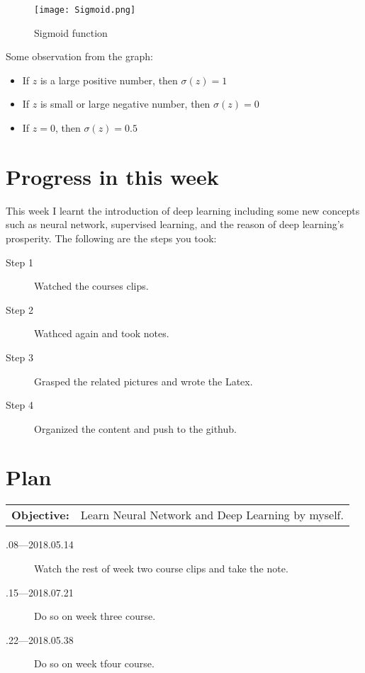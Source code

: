 \documentclass[a4paper]{article}
\begin{document}
\begin{figure}[!htp]
\begin{center}
   \texttt{[image: Sigmoid.png]}
\end{center}
   \caption{Sigmoid function}
   \label{fig:sigmoid}
\end{figure}
Some observation from the graph:
\begin{itemize}
\item If $z$ is a large positive number, then $\sigma(z)=1$
\item If $z$ is small or large negative number, then $\sigma(z)=0$
\item If $z=0$, then $\sigma(z)=0.5$
\end{itemize}


\section{Progress in this week}
This week I learnt the introduction of deep learning including some new concepts such as neural network, supervised learning, and the reason of deep learning's prosperity. The following are the steps you took:
\begin{description}
\item [Step 1]
Watched the courses clips.
\item[Step 2]
Wathced again and took notes.
\item[Step 3]
Grasped the related pictures and wrote the Latex.
\item[Step 4]
Organized the content and push to the github.
\end{description}


\section{Plan}

\begin{tabular}{rl}
	\textbf{Objective:} & Learn Neural Network and Deep Learning by myself. \\
\end{tabular}

\begin{description}
    \item[.08---2018.05.14] Watch the rest of week two course clips and take the note.
    \item[.15---2018.07.21] Do so on week three course.
    \item[.22---2018.05.38] Do so on week tfour course.
\end{description}



\end{document}
